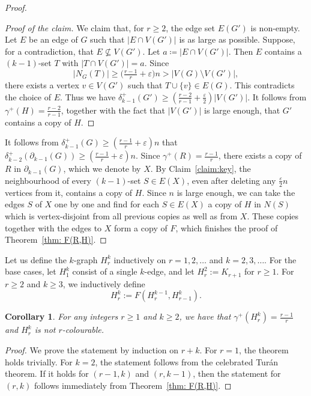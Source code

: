 \documentclass[11pt]{article}
\newcommand{\e}{\varepsilon}
\newtheorem{corollary}[theorem]{Corollary}
\newenvironment{poc}{\begin{proof}[Proof of the claim]\renewcommand*{\qedsymbol}{$\blacksquare$}}{\end{proof}}
\begin{document}
\begin{proof}
\begin{poc}
    We claim that, for $r\ge 2$, the edge set $E(G')$ is non-empty.
    Let $E$ be an edge of $G$ such that $|E\cap V(G')|$ is as large as possible.
    Suppose, for a contradiction, that $E\nsubseteq V(G')$. Let $a\coloneqq |E\cap V(G')|$. Then $E$ contains a $(k-1)$-set $T$ with $|T\cap V(G')|=a$. Since
    \[
    |N_G(T)|\ge \bigl(\tfrac{r-1}{r}+\varepsilon\bigr)n> |V(G)\setminus V(G')|,
    \]
    there exists a vertex $v\in V(G')$ such that $T\cup\{v\}\in E(G)$. This contradicts the choice of $E$.
    Thus we have $\delta_{k-1}^+(G') \ge (\frac{r-2}{r-1}+\frac{\varepsilon}{2})|V(G')|$.
    It follows from $\gamma^+(H) = \frac{r-2}{r-1}$, together with the fact that $|V(G')|$ is large enough, that $G'$ contains a copy of $H$.
    \end{poc}
It follows from $\delta_{k-1}^+(G)\ge (\frac{r-1}{r}+\varepsilon)n$ that $\delta_{k-2}^+(\partial_{k-1}(G))\ge (\frac{r-1}{r}+\varepsilon)n$.
Since $\gamma^+(R) = \frac{r-1}{r}$, there exists a copy of $R$ in $\partial_{k-1}(G)$, which we denote by $X$.
By Claim~\ref{claim:key}, the neighbourhood of every $(k-1)$-set $S\in E(X)$, even after deleting any $\frac{\e}{2}n$ vertices from it, contains a copy of $H$. Since $n$ is large enough, we can take the edges $S$ of $X$ one by one and find for each $S\in E(X)$ a copy of $H$ in $N(S)$ which is vertex-disjoint from all previous copies as well as from $X$.
These copies together with the edges to $X$ form a copy of $F$, which finishes the proof of Theorem~\ref{thm: F(R,H)}.
\end{proof}

Let us define the $k$-graph $H_r^k$ inductively on $r=1,2,\dots$ 
and $k=2,3,\dots$. For the base cases, let $H_1^k$ consist of a single $k$-edge, 
and let $H_r^2 := K_{r+1}$ for $r \ge 1$. For $r\ge 2$ and $k\ge 3$, we inductively define 
 \[
 H_r^k := F(H_r^{k-1}, H_{r-1}^k).
 \]

\begin{corollary}\label{thm:H graph}
    For any integers $r\ge 1$ and $k\ge 2$, we have that $\gamma^+(H_r^k)=\frac{r-1}{r}$ and $H_r^k$ is not $r$-colourable.
\end{corollary}
\begin{proof}
We prove the statement by induction on $r+k$. For $r=1$, the theorem holds trivially. For $k=2$, the statement follows from the celebrated Tur\'an theorem. If it holds for $(r-1,k)$ and $(r,k-1)$, then the statement for $(r,k)$ follows immediately from Theorem~\ref{thm: F(R,H)}.
\end{proof}
\end{document}

